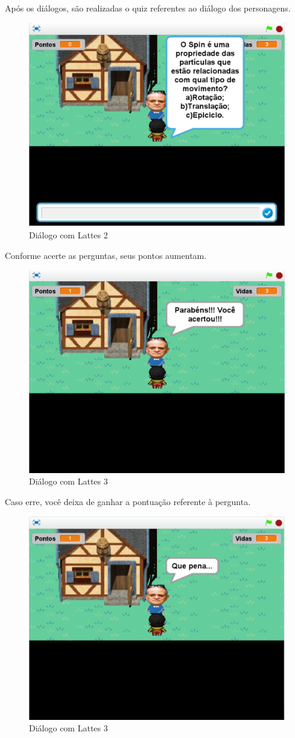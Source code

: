 \documentclass[12pt,fleqn]{book} %
\begin{document}
Após os diálogos, são realizadas o quiz referentes ao diálogo dos personagens.

\begin{figure}[h]
	\centering
	\includegraphics[width=0.65 \textwidth]{Produto/jogo_10}
	\caption{Diálogo com Lattes 2}
	\label{fig:app_a:jogo10}
\end{figure}

\newpage

Conforme acerte as perguntas, seus pontos aumentam.

\begin{figure}[h]
	\centering
	\includegraphics[width=0.65 \textwidth]{Produto/jogo_11}
	\caption{Diálogo com Lattes 3}
	\label{fig:app_a:jogo11}
\end{figure}

Caso erre, você deixa de ganhar a pontuação referente à pergunta.

\begin{figure}[h]
	\centering
	\includegraphics[width=0.65 \textwidth]{Produto/jogo_12}
	\caption{Diálogo com Lattes 3}
	\label{fig:app_a:jogo12}
\end{figure}
\end{document}
